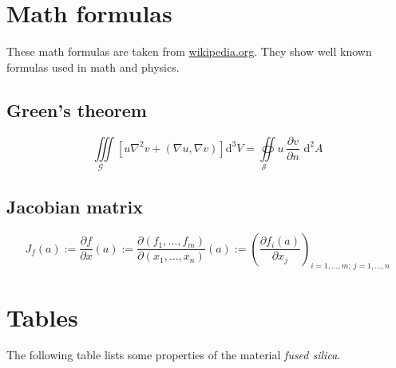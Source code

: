 \documentclass[%
   final,      %
   paper=a4,%
   paper=portrait, %
   pagesize=auto, %
   fontsize=11pt,%
   version=last, %
   english, %
 ]{scrbook} %
\begin{document}
\section{Math formulas}
These math formulas are taken from \url{wikipedia.org}. They show well known formulas used in math and physics.

\subsection{Green's theorem}
%
\begin{equation}
  \underset{\mathcal{G}\quad}\iiint
  \left[u\nabla^{2}v+\left(\nabla  u,\nabla  v\right)\right]\mathrm{d}^{3}V
  =\underset{\mathcal{S}\quad}\oiint  u\,\frac{\partial v}{\partial n}
  \,\,\mathrm{d}^{2}A
\end{equation}
%
\subsection{Jacobian matrix}
%
\begin{equation}
  J_f(a) := \frac{\partial {f}}{\partial {x}}(a) 
         := \frac{\partial(f_1,  \ldots, f_m)}{\partial(x_1, \ldots, x_n)}(a)
         := \left(\frac{\partial f_i(a)}{\partial x_j}\right)_{i=1,\ldots,m;\
             j=1,\ldots,n}
\end{equation}

\section{Tables}
The following table lists some properties of the material \emph{fused silica}. 


\end{document}
